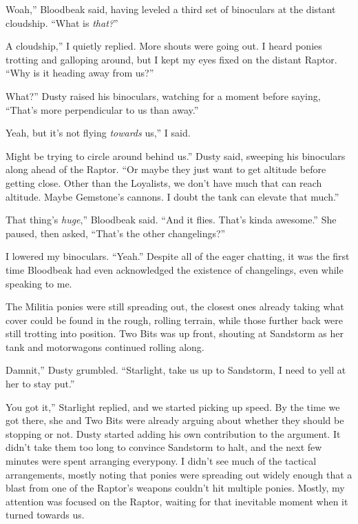 \leavevmode{}Woah,” Bloodbeak said, having leveled a third set of binoculars at the distant cloudship. “What is \textit{that?}”

\leavevmode{}A cloudship,” I quietly replied. More shouts were going out. I heard ponies trotting and galloping around, but I kept my eyes fixed on the distant Raptor. “Why is it heading away from us?”

\leavevmode{}What?” Dusty raised his binoculars, watching for a moment before saying, “That’s more perpendicular to us than away.”

\leavevmode{}Yeah, but it’s not flying \textit{towards} us,” I said.

\leavevmode{}Might be trying to circle around behind us.” Dusty said, sweeping his binoculars along ahead of the Raptor. “Or maybe they just want to get altitude before getting close. Other than the Loyalists, we don’t have much that can reach altitude. Maybe Gemstone’s cannons. I doubt the tank can elevate that much.”

\leavevmode{}That thing’s \textit{huge},” Bloodbeak said. “And it flies. That’s kinda awesome.” She paused, then asked, “That’s the other changelings?”

I lowered my binoculars. “Yeah.” Despite all of the eager chatting, it was the first time Bloodbeak had even acknowledged the existence of changelings, even while speaking to me.

The Militia ponies were still spreading out, the closest ones already taking what cover could be found in the rough, rolling terrain, while those further back were still trotting into position. Two Bits was up front, shouting at Sandstorm as her tank and motorwagons continued rolling along.

\leavevmode{}Damnit,” Dusty grumbled. “Starlight, take us up to Sandstorm, I need to yell at her to stay put.”

\leavevmode{}You got it,” Starlight replied, and we started picking up speed. By the time we got there, she and Two Bits were already arguing about whether they should be stopping or not. Dusty started adding his own contribution to the argument. It didn’t take them too long to convince Sandstorm to halt, and the next few minutes were spent arranging everypony. I didn’t see much of the tactical arrangements, mostly noting that ponies were spreading out widely enough that a blast from one of the Raptor’s weapons couldn’t hit multiple ponies. Mostly, my attention was focused on the Raptor, waiting for that inevitable moment when it turned towards us.

